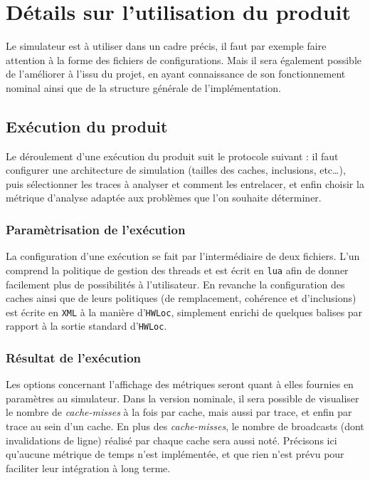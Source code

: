 \section{Détails sur l'utilisation du produit}

Le simulateur est à utiliser dans un cadre précis, il faut par exemple faire attention à la forme des fichiers de configurations. Mais il sera également possible de l'améliorer à l'issu du projet, en ayant connaissance de son fonctionnement nominal ainsi que de la structure générale de l'implémentation.

\subsection{Exécution du produit}

Le déroulement d'une exécution du produit suit le protocole suivant : il faut configurer une architecture de simulation (tailles des caches, inclusions, etc\ldots), puis sélectionner les traces à analyser et comment les entrelacer, et enfin choisir la métrique d'analyse adaptée aux problèmes que l'on souhaite déterminer.

\subsubsection{Paramètrisation de l'exécution}

La configuration d'une exécution se fait par l'intermédiaire de deux fichiers. L'un comprend la politique de gestion des threads et est écrit en \texttt{lua} afin de donner facilement plus de possibilités à l'utilisateur. En revanche la configuration des caches ainsi que de leurs politiques (de remplacement, cohérence et d'inclusions) est écrite en \texttt{XML} à la manière d'\texttt{HWLoc}, simplement enrichi de quelques balises par rapport à la sortie standard d'\texttt{HWLoc}.

\subsubsection{Résultat de l'exécution}
\label{métriques}

Les options concernant l'affichage des métriques seront quant à elles fournies en paramètres au simulateur. Dans la version nominale, il sera possible de visualiser le nombre de \emph{cache-misses} à la fois par cache, mais aussi par trace, et enfin par trace au sein d'un cache. En plus des \emph{cache-misses}, le nombre de broadcasts (dont invalidations de ligne) réalisé par chaque cache sera aussi noté. Précisons ici qu'aucune métrique de temps n'est implémentée, et que rien n'est prévu pour faciliter leur intégration à long terme.

